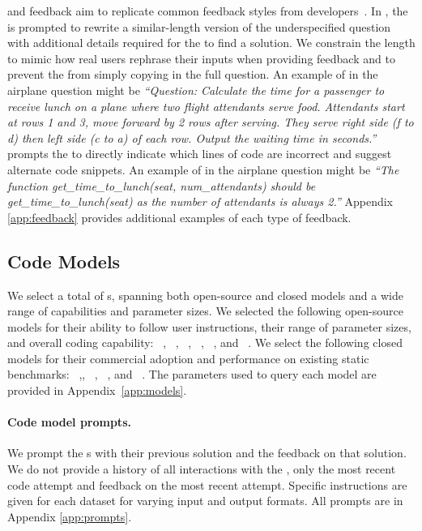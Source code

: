 \ir{} and \cf{} feedback aim to replicate common feedback styles from developers~\citep{chidambaram2024socratic}. 
In \ir{}, the \user{} is prompted to rewrite a similar-length version of the underspecified question with additional details required for the \cm{} to find a solution. 
We constrain the length to mimic how real users rephrase their inputs when providing feedback and to prevent the \user{} from simply copying in the full question.
An example of \ir{} in the airplane question might be \textit{``Question: Calculate the time for a passenger to receive lunch on a plane where two flight attendants serve food. Attendants start at rows 1 and 3, move forward by 2 rows after serving. They serve right side (f to d) then left side (c to a) of each row. Output the waiting time in seconds.''}
\cf{} prompts the \user{} to directly indicate which lines of code are incorrect and suggest alternate code snippets. 
An example of \cf{} in the airplane question might be \textit{``The function get\_time\_to\_lunch(seat, num\_attendants) should be get\_time\_to\_lunch(seat) as the number of attendants is always 2.''}
Appendix \ref{app:feedback} provides additional examples of each type of feedback.





\subsection{Code Models}
We select a total of \nmodels{} \cm s, spanning both open-source and closed models and a wide range of capabilities and parameter sizes. We selected the following open-source models for their ability to follow user instructions, their range of parameter sizes, and overall coding capability:  \deepseek~\citep{deepseekai2024deepseekv3technicalreport}, \gemmaSmall~\citep{gemmateam2024gemmaopenmodelsbased}, \gemmaLarge{}~\citep{gemmateam2024gemma2improvingopen}, \llama{}~\citep{grattafiori2024llama3herdmodels}, \qwenSmall{}~\citep{hui2024qwen25codertechnicalreport}, and \qwenLarge{}~\citep{hui2024qwen25codertechnicalreport}. 
We select the following closed models for their commercial adoption and performance on existing static benchmarks:
\aya{}~\citep{aya2024modelinstructionfinetuned},, \gpt{}~\citep{openai2024gpt4ocard}, \reka{}~\citep{rekateam2024rekacoreflashedge}, and \sonnet{}~\citep{claude}. The parameters used to query each model are provided in Appendix~\ref{app:models}.

\paragraph{Code model prompts.} 
We prompt the \cm s with their previous solution and the \user{} feedback on that solution. 
We do not provide a history of all \cm{} interactions with the \user{}, only the most recent code attempt and \user{} feedback on the most recent attempt.
Specific instructions are given for each dataset for varying input and output formats.
All prompts are in Appendix \ref{app:prompts}.





